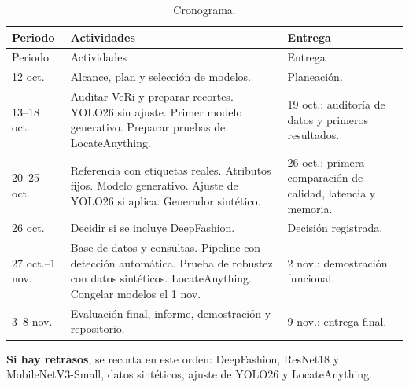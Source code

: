 \documentclass[11pt,a4paper]{article}
\begin{document}
\begin{longtable}{@{}p{3cm}p{7cm}p{4.5cm}@{}}
\caption{Cronograma.}\\
\toprule
Periodo & Actividades & Entrega \\
\midrule
\endfirsthead
\toprule
Periodo & Actividades & Entrega \\
\midrule
\endhead
12 oct. & Alcance, plan y selecci\'on de modelos. & Planeaci\'on. \\
\midrule
13--18 oct. & Auditar VeRi y preparar recortes. YOLO26 sin ajuste. Primer modelo generativo. Preparar pruebas de LocateAnything. & 19 oct.: auditor\'ia de datos y primeros resultados. \\
\midrule
20--25 oct. & Referencia con etiquetas reales. Atributos fijos. Modelo generativo. Ajuste de YOLO26 si aplica. Generador sint\'etico. & 26 oct.: primera comparaci\'on de calidad, latencia y memoria. \\
\midrule
26 oct. & Decidir si se incluye DeepFashion. & Decisi\'on registrada. \\
\midrule
27 oct.--1 nov. & Base de datos y consultas. Pipeline con detecci\'on autom\'atica. Prueba de robustez con datos sint\'eticos. LocateAnything. Congelar modelos el 1 nov. & 2 nov.: demostraci\'on funcional. \\
\midrule
3--8 nov. & Evaluaci\'on final, informe, demostraci\'on y repositorio. & 9 nov.: entrega final. \\
\bottomrule
\end{longtable}

\textbf{Si hay retrasos}, se recorta en este orden: DeepFashion, ResNet18 y MobileNetV3-Small, datos sint\'eticos, ajuste de YOLO26 y LocateAnything.
\end{document}
